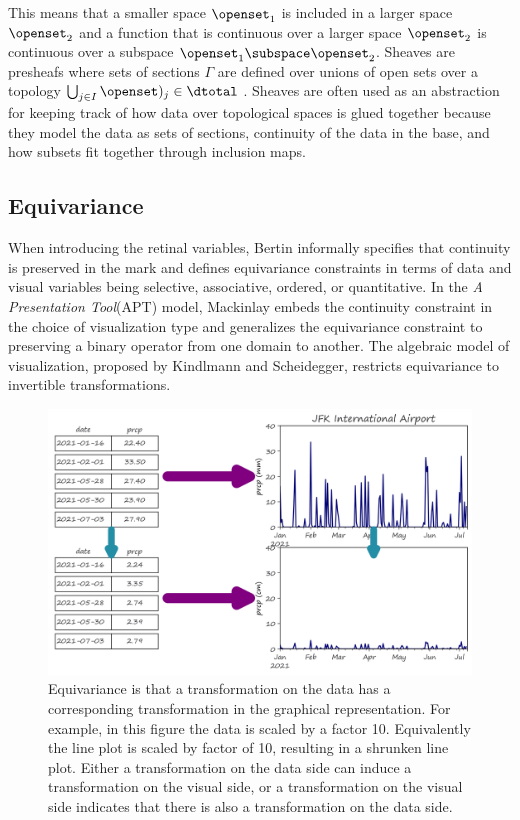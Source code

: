 \documentclass[10pt,journal,compsoc]{IEEEtran}
\theoremstyle{definition}
\theoremstyle{remark}
\begin{document}
This means that a smaller space $\openset_1$ is included in a larger space $\openset_2$ and a function that is continuous over a larger space $\openset_2$ is continuous over a subspace $\openset_1 \subspace \openset_2$. Sheaves are presheafs where sets of sections $\Gamma$ are defined over unions of open sets over a topology $\bigcup_{j \in I} \openset)_j \in \dtotal$ \cite{spanier1989algebraic, nlab:sheaf}. Sheaves are often used as an abstraction for keeping track of how data over topological spaces is glued together \cite{ghristElementaryAppliedTopology2014} because they model the data as sets of sections, continuity of the data in the base, and how subsets fit together through inclusion maps.  


\subsection{Equivariance}
\label{sec:related-work:equivariance}
When introducing the retinal variables, Bertin informally specifies that continuity is preserved in the mark and defines equivariance constraints in terms of data and visual variables being selective, associative, ordered, or quantitative\cite{bertinSemiologyGraphicsDiagrams2011a}. In the \textit{A Presentation Tool}(APT) model, Mackinlay embeds the continuity constraint in the choice of visualization type and generalizes the equivariance constraint to preserving a binary operator from one domain to another. The algebraic model of visualization\cite{kindlmannAlgebraicProcessVisualization2014}, proposed by Kindlmann and Scheidegger, restricts equivariance to invertible transformations.

\begin{figure}[!h]
  \label{fig:related-work:equivariance}
  \includegraphics[width=\columnwidth]{equiv.png}
  \caption{Equivariance is that a transformation on the data has a corresponding transformation in the graphical representation. For example, in this figure the data is scaled by a factor 10. Equivalently the line plot is scaled by factor of 10, resulting in a shrunken line plot. Either a transformation on the data side can induce a transformation on the visual side, or a transformation on the visual side indicates that there is also a transformation on the data side. }
\end{figure}
\end{document}
